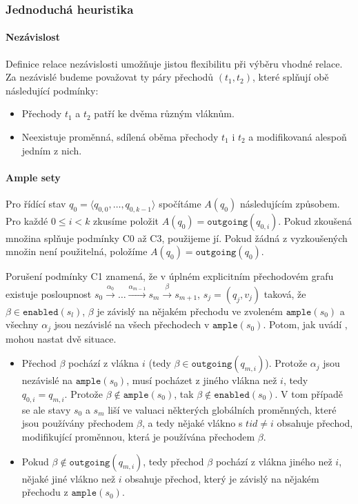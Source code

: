 \documentclass[10pt,a4paper,notitlepage]{report}
\newcommand{\tuple}[1]{\langle #1 \rangle}
\begin{document}
\subsubsection{Jednoduchá heuristika}
\paragraph{Nezávislost}
Definice relace nezávislosti umožňuje jistou flexibilitu při výběru vhodné relace. Za nezávislé budeme považovat ty páry přechodů $(t_1, t_2)$, které splňují obě následující podmínky:
\begin{itemize}
\item Přechody $t_1$ a $t_2$ patří ke dvěma různým vláknům.
\item Neexistuje proměnná, sdílená oběma přechody $t_1$ i $t_2$ a modifikovaná alespoň jedním z nich.
\end{itemize}


\paragraph{Ample sety}
Pro řídící stav $q_0 = \tuple{q_{0,0}, \ldots, q_{0,k-1}}$ spočítáme $A(q_0)$ následujícím způsobem. Pro každé $0 \leq i < k$ zkusíme položit $A(q_0) = \texttt{outgoing}(q_{0,i})$. Pokud zkoušená množina splňuje podmínky C0 až C3, použijeme jí. Pokud žádná z vyzkoušených množin není použitelná, položíme $A(q_0) = \texttt{outgoing}(q_0)$.

Porušení podmínky C1 \label{subsec:c1-violation} znamená, že v úplném explicitním přechodovém grafu existuje posloupnost $s_0 \xrightarrow{\alpha_0} \ldots \xrightarrow{\alpha_{m-1}} s_m \xrightarrow{\beta} s_{m+1}$, $s_j = (q_j, v_j)$ taková, že $\beta \in \texttt{enabled}(s_l)$, $\beta$ je závislý na nějakém přechodu ve zvoleném $\texttt{ample}(s_0)$ a všechny $\alpha_j$ jsou nezávislé na všech přechodech v $\texttt{ample}(s_0)$. Potom, jak uvádí \cite{CLARKE}, mohou nastat dvě situace.

\begin{itemize}
\item Přechod $\beta$ pochází z vlákna $i$ (tedy $\beta \in \texttt{outgoing}(q_{m,i})$).  Protože $\alpha_j$ jsou nezávislé na $\texttt{ample}(s_0)$, musí pocházet z jiného vlákna než $i$, tedy $q_{0,i} = q_{m,i}$. Protože $\beta \not \in \texttt{ample}(s_0)$, tak $\beta \not \in \texttt{enabled}(s_0)$. V tom případě se ale stavy $s_0$ a $s_m$ liší ve valuaci některých globálních proměnných, které jsou používány přechodem $\beta$, a tedy nějaké vlákno s $tid \neq i$ obsahuje přechod, modifikující proměnnou, která je používána přechodem $\beta$.

\item Pokud $\beta \not \in \texttt{outgoing}(q_{m,i})$, tedy přechod $\beta$ pochází z vlákna jiného než $i$, nějaké jiné vlákno než $i$ obsahuje přechod, který je závislý na nějakém přechodu z $\texttt{ample}(s_0)$. 
\end{itemize}
\end{document}
